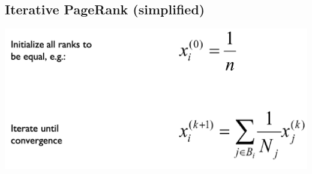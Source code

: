 \documentclass[11pt]{article}
\theoremstyle{definition}
\begin{document}
\subsection{Iterative PageRank (simplified)}
\includegraphics[width=\textwidth/2]{27.png}
\end{document}
